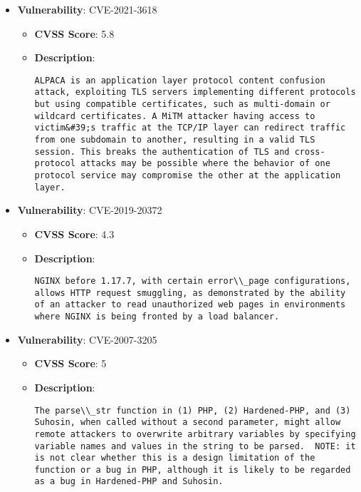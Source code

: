 \documentclass{article}
\begin{document}
\begin{itemize}
        \item \textbf{Vulnerability}: CVE-2021-3618
        \begin{itemize}
            \item \textbf{CVSS Score}:  5.8 
            \item \textbf{Description}:
            \parbox[t]{0.9\linewidth}{
                \verb|ALPACA is an application layer protocol content confusion attack, exploiting TLS servers implementing different protocols but using compatible certificates, such as multi-domain or wildcard certificates. A MiTM attacker having access to victim&#39;s traffic at the TCP/IP layer can redirect traffic from one subdomain to another, resulting in a valid TLS session. This breaks the authentication of TLS and cross-protocol attacks may be possible where the behavior of one protocol service may compromise the other at the application layer.|
            }
        \end{itemize}
    
        \item \textbf{Vulnerability}: CVE-2019-20372
        \begin{itemize}
            \item \textbf{CVSS Score}:  4.3 
            \item \textbf{Description}:
            \parbox[t]{0.9\linewidth}{
                \verb|NGINX before 1.17.7, with certain error\\_page configurations, allows HTTP request smuggling, as demonstrated by the ability of an attacker to read unauthorized web pages in environments where NGINX is being fronted by a load balancer.|
            }
        \end{itemize}
    
        \item \textbf{Vulnerability}: CVE-2007-3205
        \begin{itemize}
            \item \textbf{CVSS Score}:  5 
            \item \textbf{Description}:
            \parbox[t]{0.9\linewidth}{
                \verb|The parse\\_str function in (1) PHP, (2) Hardened-PHP, and (3) Suhosin, when called without a second parameter, might allow remote attackers to overwrite arbitrary variables by specifying variable names and values in the string to be parsed.  NOTE: it is not clear whether this is a design limitation of the function or a bug in PHP, although it is likely to be regarded as a bug in Hardened-PHP and Suhosin.|
            }
        \end{itemize}
    

\end{itemize}
\end{document}
